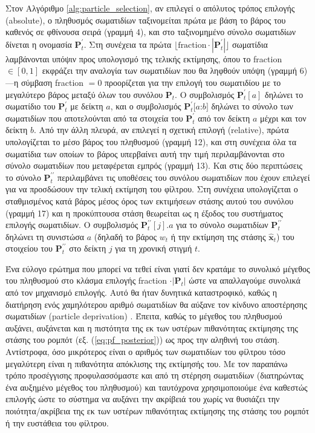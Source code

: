 Στον Αλγόριθμο \ref{alg:particle_selection}, αν επιλεγεί ο απόλυτος τρόπος
επιλογής (absolute), ο πληθυσμός σωματιδίων ταξινομείται πρώτα με βάση το βάρος
του καθενός σε φθίνουσα σειρά (γραμμή 4), και στο ταξινομημένο σύνολο
σωματιδίων δίνεται η ονομασία $\bm{P}_t^\prime$. Στη συνέχεια τα πρώτα $\lfloor
\text{fraction}\cdot|\bm{P}_t^\prime| \rfloor$ σωματίδια λαμβάνονται υπόψιν
προς υπολογισμό της τελικής εκτίμησης, όπου το fraction $\in [0,1]$ εκφράζει
την αναλογία των σωματιδίων που θα ληφθούν υπόψη (γραμμή 6)---η σύμβαση
fraction $=0$ προορίζεται για την επιλογή του σωματιδίου με το μεγαλύτερο βάρος
μεταξύ όλων του συνόλου $\bm{P}_t$. Ο συμβολισμός $\bm{P}_t^\prime[a]$ δηλώνει
το σωματίδιο του $\bm{P}_t^\prime$ με δείκτη $a$, και ο συμβολισμός
$\bm{P}_t^\prime[a$:$b]$ δηλώνει το σύνολο των σωματιδίων που αποτελούνται από
τα στοιχεία του $\bm{P}_t^\prime$ από τον δείκτη $a$ μέχρι και τον δείκτη $b$.
Από την άλλη πλευρά, αν επιλεγεί η σχετική επιλογή (relative), πρώτα
υπολογίζεται το μέσο βάρος του πληθυσμού (γραμμή 12), και στη συνέχεια όλα τα
σωματίδια των οποίων το βάρος υπερβαίνει αυτή την τιμή περιλαμβάνονται στο
σύνολο σωματιδίων που μεταφέρεται εμπρός (γραμμή 13).  Και στις δύο περιπτώσεις
το σύνολο $\bm{P}_t^{\prime\prime}$ περιλαμβάνει τις υποθέσεις του συνόλου
σωματιδίων που έχουν επιλεγεί για να προσδώσουν την τελική εκτίμηση του
φίλτρου.  Στη συνέχεια υπολογίζεται ο σταθμισμένος κατά βάρος μέσος όρος των
εκτιμήσεων στάσης αυτού του συνόλου (γραμμή 17) και η προκύπτουσα στάση
θεωρείται ως η έξοδος του συστήματος επιλογής σωματιδίων. Ο συμβολισμός
$\bm{P}_t^{\prime\prime}[j].a$ για το σύνολο σωματιδίων
$\bm{P}_t^{\prime\prime}$ δηλώνει τη συνιστώσα $a$ (δηλαδή το βάρος $w_t$ ή την
εκτίμηση της στάσης $\hat{\bm{x}}_t$) του στοιχείου του
$\bm{P}_t^{\prime\prime}$ στο δείκτη $j$ για τη χρονική στιγμή $t$.

Ένα εύλογο ερώτημα που μπορεί να τεθεί είναι γιατί δεν κρατάμε το συνολικό
μέγεθος του πληθυσμού στο κλάσμα επιλογής fraction $\cdot |\bm{P}_t|$ ώστε να
απαλλαγούμε συνολικά από τον μηχανισμό επιλογής. Αυτό θα ήταν δυνητικά
καταστροφικό, καθώς η διατήρηση ενός χαμηλότερου αριθμό σωματιδίων θα αύξανε
τον κίνδυνο αποστέρησης σωματιδίων (particle deprivation)
\cite{thrun2005probabilistic}. Έπειτα, καθώς το μέγεθος του πληθυσμού αυξάνει,
αυξάνεται και η πιστότητα της εκ των υστέρων πιθανότητας εκτίμησης της στάσης
του ρομπότ (εξ. (\ref{eq:pf_posterior})) ως προς την αληθινή του στάση.
Αντίστροφα, όσο μικρότερος είναι ο αριθμός των σωματιδίων του φίλτρου τόσο
μεγαλύτερη είναι η πιθανότητα απόκλισης της εκτίμησής του. Με τον παραπάνω
τρόπο προσέγγισης προφυλασσόμαστε και από τη στέρηση σωματιδίων (διατηρώντας
ένα αυξημένο μέγεθος του πληθυσμού) και ταυτόχρονα χρησιμοποιούμε ένα καθεστώς
επιλογής ώστε το σύστημα να αυξάνει την ακρίβειά του χωρίς να θυσιάζει την
ποιότητα/ακρίβεια της εκ των υστέρων πιθανότητας εκτίμησης της στάσης του
ρομπότ ή την ευστάθεια του φίλτρου.

